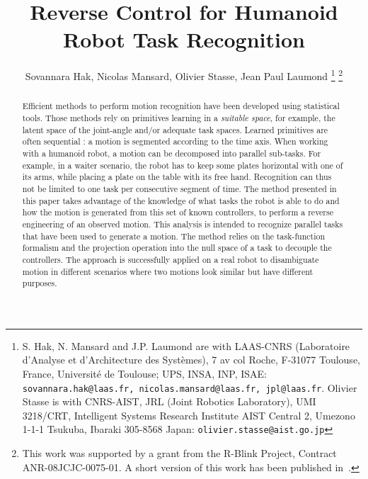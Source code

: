 \documentclass[journal]{IEEEtran}
\begin{document}
\title{\LARGE Reverse Control for Humanoid Robot Task Recognition}

\author{Sovannara Hak, Nicolas Mansard, Olivier Stasse, Jean Paul Laumond%
  \thanks{S. Hak, N. Mansard and J.P. Laumond are with LAAS-CNRS (Laboratoire d'Analyse et d'Architecture
  des Syst\`emes), 7 av col Roche, F-31077 Toulouse, France, Universit\'e de Toulouse; UPS, INSA, INP, ISAE: {\tt\small sovannara.hak@laas.fr, nicolas.mansard@laas.fr, jpl@laas.fr}. 
  Olivier Stasse is with CNRS-AIST, JRL (Joint Robotics Laboratory), UMI 3218/CRT,
    Intelligent Systems Research Institute AIST Central 2, Umezono 1-1-1
    Tsukuba, Ibaraki 305-8568 Japan: {\tt\small olivier.stasse@aist.go.jp}}
  \thanks{This work was supported by a grant from the R-Blink Project, Contract
  ANR-08JCJC-0075-01. A short version of this work has been published in~\cite{hak10}.}  }

%
\maketitle


\begin{abstract}
Efficient methods to perform motion recognition have been developed
using statistical tools. Those methods rely on primitives learning
in a \emph{suitable space}, for example, the latent space of the joint-angle and/or adequate task spaces.
Learned primitives are often sequential : a motion is segmented according to the time axis.
When working with a humanoid robot, a motion can be decomposed into
parallel sub-tasks. For example, in a waiter scenario,
the robot has to keep some plates horizontal with one of its arms, while placing a plate
on the table with its free hand.
Recognition can thus not be limited to one task per consecutive segment of 
time.
The method presented in this paper
takes advantage of the knowledge of what tasks the robot is able to do and how
the motion is generated from this set of known controllers, to perform a reverse engineering of an
observed motion. This analysis is intended to recognize parallel tasks that
have been used to generate a motion. The method relies
on the task-function formalism and the projection operation into the null space of a task to decouple
the controllers.
The approach is successfully applied on a real robot
to disambiguate motion in different scenarios where two motions look similar but have
different purposes.
\end{abstract}
\end{document}

